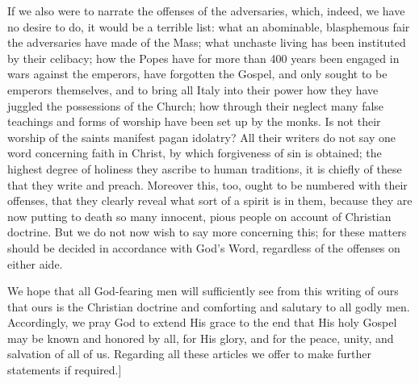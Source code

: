 If we also were to narrate the offenses of the adversaries, which,
indeed, we have no desire to do, it would be a terrible list: what an
abominable, blasphemous fair the adversaries have made of the Mass;
what unchaste living has been instituted by their celibacy; how the
Popes have for more than 400 years been engaged in wars against the
emperors, have forgotten the Gospel, and only sought to be emperors
themselves, and to bring all Italy into their power how they have
juggled the possessions of the Church; how through their neglect many
false teachings and forms of worship have been set up by the monks.
Is not their worship of the saints manifest pagan idolatry?  All
their writers do not say one word concerning faith in Christ, by
which forgiveness of sin is obtained; the highest degree of holiness
they ascribe to human traditions, it is chiefly of these that they
write and preach.  Moreover this, too, ought to be numbered with
their offenses, that they clearly reveal what sort of a spirit is in
them, because they are now putting to death so many innocent, pious
people on account of Christian doctrine.  But we do not now wish to
say more concerning this; for these matters should be decided in
accordance with God's Word, regardless of the offenses on either aide.

We hope that all God-fearing men will sufficiently see from this
writing of ours that ours is the Christian doctrine and comforting
and salutary to all godly men.  Accordingly, we pray God to extend
His grace to the end that His holy Gospel may be known and honored by
all, for His glory, and for the peace, unity, and salvation of all of
us.  Regarding all these articles we offer to make further statements
if required.]
